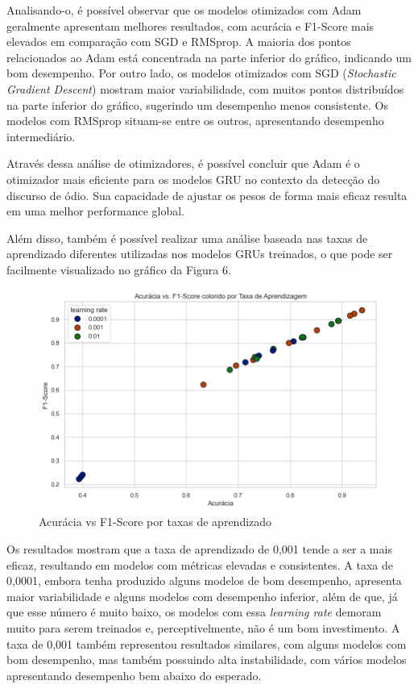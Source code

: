 \documentclass[conference]{IEEEtran}
\begin{document}
Analisando-o, é possível observar que os modelos otimizados com Adam geralmente apresentam melhores resultados, com acurácia e F1-Score mais elevados em comparação com SGD e RMSprop. A maioria dos pontos relacionados ao Adam está concentrada na parte inferior do gráfico, indicando um bom desempenho. Por outro lado, os modelos otimizados com SGD (\textit{Stochastic Gradient Descent}) mostram maior variabilidade, com muitos pontos distribuídos na parte inferior do gráfico, sugerindo um desempenho menos consistente. Os modelos com RMSprop situam-se entre os outros, apresentando desempenho intermediário.

Através dessa análise de otimizadores, é possível concluir que Adam é o otimizador mais eficiente para os modelos GRU no contexto da detecção do discurso de ódio. Sua capacidade de ajustar os pesos de forma mais eficaz resulta em uma melhor performance global.

Além disso, também é possível realizar uma análise baseada nas taxas de aprendizado diferentes utilizadas nos modelos GRUs treinados, o que pode ser facilmente visualizado no gráfico da Figura 6.

\begin{figure}[h!]
    \centering
    \includegraphics[width=\linewidth]{gru-lr.png}
    \caption{Acurácia vs F1-Score por taxas de aprendizado}
    \label{fig:exemplo5}
\end{figure}

Os resultados mostram que a taxa de aprendizado de 0,001 tende a ser a mais eficaz, resultando em modelos com métricas elevadas e consistentes. A taxa de 0,0001, embora tenha produzido alguns modelos de bom desempenho, apresenta maior variabilidade e alguns modelos com desempenho inferior, além de que, já que esse número é muito baixo, os modelos com essa \textit{learning rate} demoram muito para serem treinados e, perceptivelmente, não é um bom investimento. A taxa de 0,001 também representou resultados similares, com alguns modelos com bom desempenho, mas também possuindo alta instabilidade, com vários modelos apresentando desempenho bem abaixo do esperado.
\end{document}
